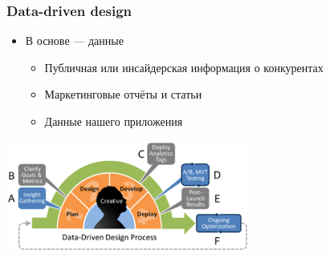 \documentclass{../../slides-style}
\begin{document}
    \begin{frame}
        \frametitle{Data-driven design}
        \begin{itemize}
            \item В основе --- данные
            \begin{itemize}
                \item Публичная или инсайдерская информация о конкурентах
                \item Маркетинговые отчёты и статьи
                \item Данные нашего приложения
            \end{itemize}
        \end{itemize}
        \begin{center}
            \includegraphics[width=0.6\textwidth]{dataDrivenDesign.png}
        \end{center}
    \end{frame}
\end{document}
